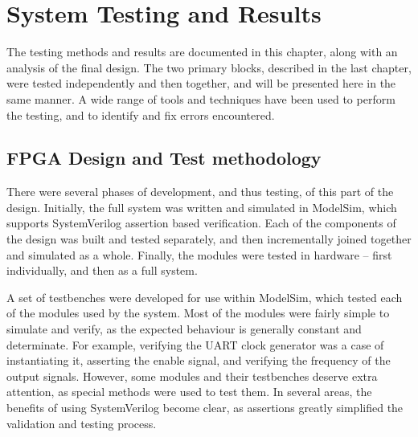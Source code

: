\chapter{System Testing and Results} %
\label{cha:system_testing}


The testing methods and results are documented in this chapter, along with an analysis of the final design.  The two primary blocks, described in the last chapter, were tested independently and then together, and will be presented here in the same manner.  A wide range of tools and techniques have been used to perform the testing, and to identify and fix errors encountered.


\section{FPGA Design and Test methodology} %
\label{sec:fpga_design_and_test_methodology}
	There were several phases of development, and thus testing, of this part of the design.  Initially, the full system was written and simulated in ModelSim, which supports SystemVerilog assertion based verification.  Each of the components of the design was built and tested separately, and then incrementally joined together and simulated as a whole.  Finally, the modules were tested in hardware -- first individually, and then as a full system.

	A set of testbenches were developed for use within ModelSim, which tested each of the modules used by the system.  Most of the modules were fairly simple to simulate and verify, as the expected behaviour is generally constant and determinate.  For example, verifying the UART clock generator was a case of instantiating it, asserting the enable signal, and verifying the frequency of the output signals.  However, some modules and their testbenches deserve extra attention, as special methods were used to test them.  In several areas, the benefits of using SystemVerilog become clear, as assertions greatly simplified the validation and testing process.


